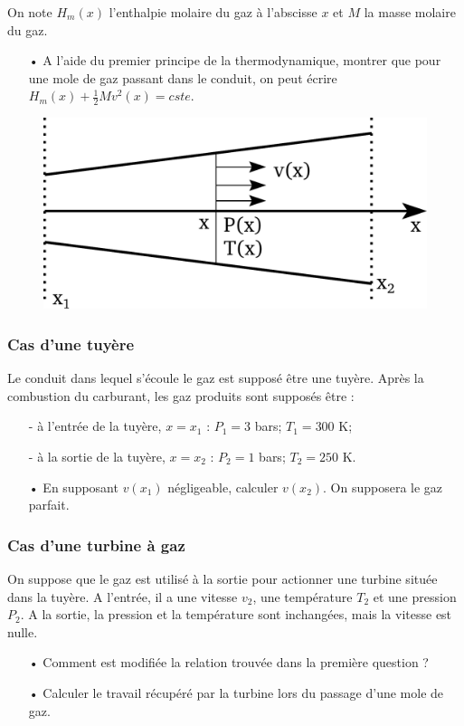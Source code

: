 \documentclass{report}
\begin{document}
On note $H_{m}(x)$ l'enthalpie molaire du gaz à l'abscisse $x$ et $M$ la masse molaire du gaz. 

\begin{itemize}

\item[•] A l'aide du premier principe de la thermodynamique, montrer que pour une mole de gaz passant dans le conduit, on peut écrire $H_{m}(x)+\frac{1}{2}Mv^{2}(x)= cste$.

\end{itemize}

\begin{figure}[!h]
\centering
\includegraphics[width=0.4\linewidth]{turbine.pdf}
\end{figure}

\subsubsection*{Cas d'une tuyère}

Le conduit dans lequel s'écoule le gaz est supposé être une tuyère. Après la combustion du carburant, les gaz produits sont supposés être :
\begin{itemize}
\item[-] à l'entrée de la tuyère, $x=x_{1}$ : $P_{1} = 3$ bars; $T_{1} = 300$ K;
\item[-] à la sortie de la tuyère, $x=x_{2}$ : $P_{2} = 1$ bars; $T_{2} = 250$ K.
\end{itemize}

\begin{itemize}
\item[•] En supposant $v(x_{1})$ négligeable, calculer $v(x_{2})$. On supposera le gaz parfait. 

\end{itemize}

\subsubsection*{Cas d'une turbine à gaz}

On suppose que le gaz est utilisé à la sortie pour actionner une turbine située dans la tuyère. A l'entrée, il a une vitesse $v_{2}$, une température $T_{2}$ et une pression $P_{2}$. A la sortie, la pression et la température sont inchangées, mais la vitesse est nulle. 
\begin{itemize}

\item[•] Comment est modifiée la relation trouvée dans la première question ?

\item[•] Calculer le travail récupéré par la turbine lors du passage d'une mole de gaz.

\end{itemize}
\end{document}
